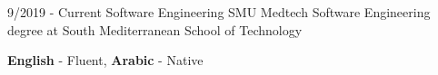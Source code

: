 \documentclass[9pt]{developercv} %
\begin{document}
\vspace{-10 pt}
\begin{entrylist}
	\entry
	{9/2019 - Current}
	{Software Engineering}
	{SMU Medtech}
	{Software Engineering degree at South Mediterranean School of Technology}
\end{entrylist}

\vspace{-10 pt}
\vspace{-6pt}

\hspace{26mm} \textbf{English} - Fluent, \textbf{ Arabic} - Native

\end{document}
